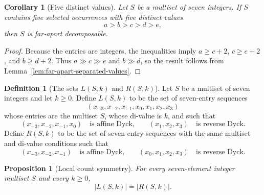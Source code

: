 \documentclass[11pt]{article}
\theoremstyle{plain}
\newtheorem{proposition}[theorem]{Proposition}
\newtheorem{corollary}[theorem]{Corollary}
\theoremstyle{definition}
\newtheorem{definition}[theorem]{Definition}
\theoremstyle{remark}
\newcommand{\di}{\mathrm{di}}
\begin{document}
\begin{corollary}[Five distinct values]
\label{cor:five-distinct-far-apart}
Let \(S\) be a multiset of seven integers. If \(S\) contains five selected
occurrences with five distinct values
\[
  a>b>c>d>e,
\]
then \(S\) is far-apart decomposable.
\end{corollary}

\begin{proof}
Because the entries are integers, the inequalities imply
\(a\ge c+2\), \(c\ge e+2\), and \(b\ge d+2\).  Thus
\(a\gg c\gg e\) and \(b\gg d\), so the result follows from
Lemma~\ref{lem:far-apart-separated-values}.
\end{proof}

\begin{definition}[The sets \(L(S,k)\) and \(R(S,k)\)]
\label{def:LR-windows}
Let \(S\) be a multiset of seven integers and let \(k\ge 0\).  Define
\(L(S,k)\) to be the set of seven-entry sequences
\[
  (x_{-3},x_{-2},x_{-1},x_0,x_1,x_2,x_3)
\]
whose entries are the multiset \(S\), whose \(\di\)-value is \(k\), and such
that
\[
  (x_{-3},x_{-2},x_{-1},x_0)
  \quad\text{is affine Dyck,}
  \qquad
  (x_1,x_2,x_3)
  \quad\text{is reverse Dyck.}
\]
Define \(R(S,k)\) to be the set of seven-entry sequences with the same multiset
and \(\di\)-value conditions such that
\[
  (x_{-3},x_{-2},x_{-1})
  \quad\text{is affine Dyck,}
  \qquad
  (x_0,x_1,x_2,x_3)
  \quad\text{is reverse Dyck.}
\]
\end{definition}

\begin{proposition}[Local count symmetry]
\label{prop:LR-cardinality}
For every seven-element integer multiset \(S\) and every \(k\ge 0\),
\[
  |L(S,k)|=|R(S,k)|.
\]
\end{proposition}
\end{document}
